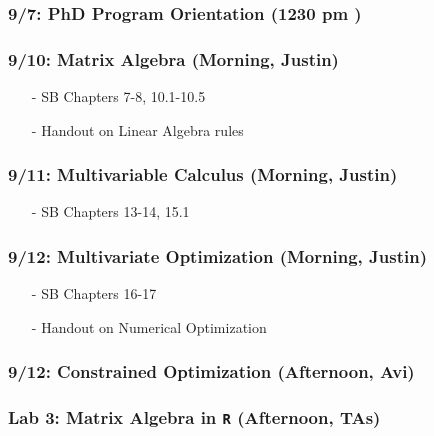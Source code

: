 \documentclass[11pt,letterpaper]{article}
\numberwithin{equation}{section}
\begin{document}
\subsubsection*{9/7: PhD Program Orientation (1230 pm )}



\subsubsection*{9/10: Matrix Algebra (Morning, Justin)}
\begin{itemize}
\item[-] SB Chapters 7-8, 10.1-10.5
\item[-] Handout on Linear Algebra rules
\end{itemize}





\subsubsection*{9/11: Multivariable Calculus (Morning, Justin)}


\begin{itemize}
\item[-] SB Chapters 13-14, 15.1
\end{itemize}





\subsubsection*{9/12: Multivariate Optimization (Morning, Justin)}


\begin{itemize}
\item[-] SB Chapters 16-17
\item[-] Handout on Numerical Optimization
\end{itemize}

\subsubsection*{9/12: Constrained Optimization (Afternoon, Avi)}



\subsubsection*{Lab 3: Matrix Algebra in {\tt R} (Afternoon, TAs)}
\end{document}
